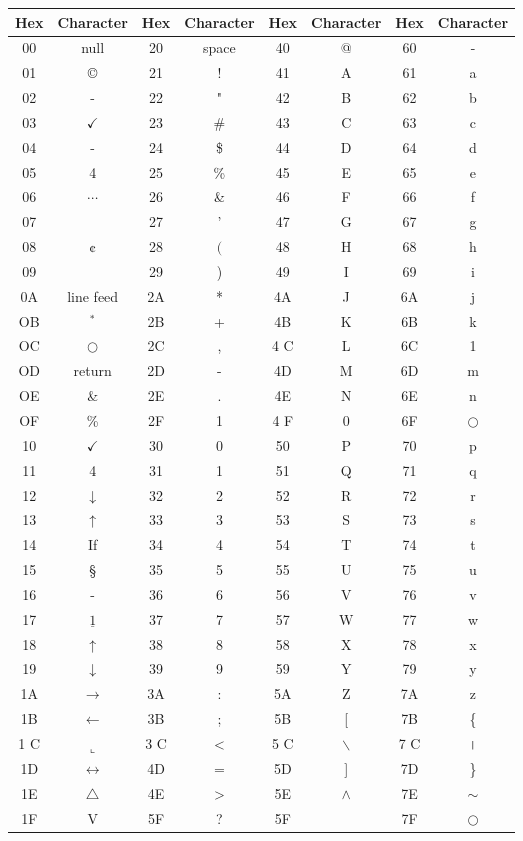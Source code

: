 \documentclass[10pt]{book}
\begin{document}
\begin{center}
\begin{tabular}{|c|c|c|c|c|c|c|c|}
\hline
Hex & Character & Hex & Character & Hex & Character & Hex & Character \\
\hline
00 & null & 20 & space & 40 & @ & 60 & - \\
\hline
01 & © & 21 & ! & 41 & A & 61 & a \\
\hline
02 & - & 22 & " & 42 & B & 62 & b \\
\hline
03 & $\checkmark$ & 23 & \# & 43 & C & 63 & c \\
\hline
04 & - & 24 & \$ & 44 & D & 64 & d \\
\hline
05 & 4 & 25 & \% & 45 & E & 65 & e \\
\hline
06 & $\cdots$ & 26 & \& & 46 & F & 66 & f \\
\hline
07 &  & 27 & ' & 47 & G & 67 & g \\
\hline
08 & ¢ & 28 & $($ & 48 & H & 68 & h \\
\hline
09 &  & 29 & ) & 49 & I & 69 & i \\
\hline
0A & line feed & 2A & * & 4A & J & 6A & j \\
\hline
OB & ${ }^{*}$ & 2B & + & 4B & K & 6B & k \\
\hline
OC & $\bigcirc$ & 2C & , & 4 C & L & 6C & 1 \\
\hline
OD & return & 2D & - & 4D & M & 6D & m \\
\hline
OE & \& & 2E & . & 4E & N & 6E & n \\
\hline
OF & \% & 2F & 1 & 4 F & 0 & 6F & $\bigcirc$ \\
\hline
10 & $\checkmark$ & 30 & 0 & 50 & P & 70 & p \\
\hline
11 & 4 & 31 & 1 & 51 & Q & 71 & q \\
\hline
12 & $\downarrow$ & 32 & 2 & 52 & R & 72 & r \\
\hline
13 & $\uparrow$ & 33 & 3 & 53 & S & 73 & s \\
\hline
14 & If & 34 & 4 & 54 & T & 74 & t \\
\hline
15 & § & 35 & 5 & 55 & U & 75 & u \\
\hline
16 & - & 36 & 6 & 56 & V & 76 & v \\
\hline
17 & $\underline{1}$ & 37 & 7 & 57 & W & 77 & w \\
\hline
18 & $\uparrow$ & 38 & 8 & 58 & X & 78 & x \\
\hline
19 & $\downarrow$ & 39 & 9 & 59 & Y & 79 & y \\
\hline
1A & $\rightarrow$ & 3A & : & 5A & Z & 7A & z \\
\hline
1B & $\leftarrow$ & 3B & ; & 5B & [ & 7B & \{ \\
\hline
1 C & $\llcorner$ & 3 C & < & 5 C & $\backslash$ & 7 C & । \\
\hline
1D & $\leftrightarrow$ & 4D & $=$ & 5D & ] & 7D & \} \\
\hline
1E & $\triangle$ & 4E & > & 5E & $\wedge$ & 7E & $\sim$ \\
\hline
1F & V & 5F & ? & 5F &  & 7F & $\bigcirc$ \\
\hline
\end{tabular}
\end{center}
\end{document}
